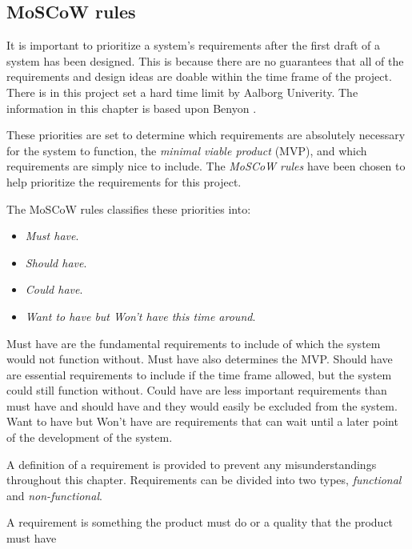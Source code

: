 \subsection{MoSCoW rules}\label{sec:requirements}

It is important to prioritize a system's requirements after the first draft of a system has been designed.
This is because there are no guarantees that all of the requirements and design ideas are doable within the time frame of the project.
There is in this project set a hard time limit by Aalborg Univerity.
The information in this chapter is based upon Benyon \cite{Benyon}.

These priorities are set to determine which requirements are absolutely necessary for the system to function, the \textit{minimal viable product} (MVP), and which requirements are simply nice to include.
The \textit{MoSCoW rules} have been chosen to help prioritize the requirements for this project.

The MoSCoW rules classifies these priorities into:

\begin{itemize}
    \item \textit{Must have}.
    \item \textit{Should have}.
    \item \textit{Could have}.
    \item \textit{Want to have but Won’t have this time around}.
\end{itemize}

Must have are the fundamental requirements to include of which the system would not function without.
Must have also determines the MVP.
Should have are essential requirements to include if the time frame allowed, but the system could still function without.
Could have are less important requirements than must have and should have and they would easily be excluded from the system.
Want to have but Won't have are requirements that can wait until a later point of the development of the system.

A definition of a requirement is provided to prevent any misunderstandings throughout this chapter.
Requirements can be divided into two types, \textit{functional} and \textit{non-functional}.

\begin{defn}
    A requirement is something the product must do or a quality that the product must have
\end{defn}

